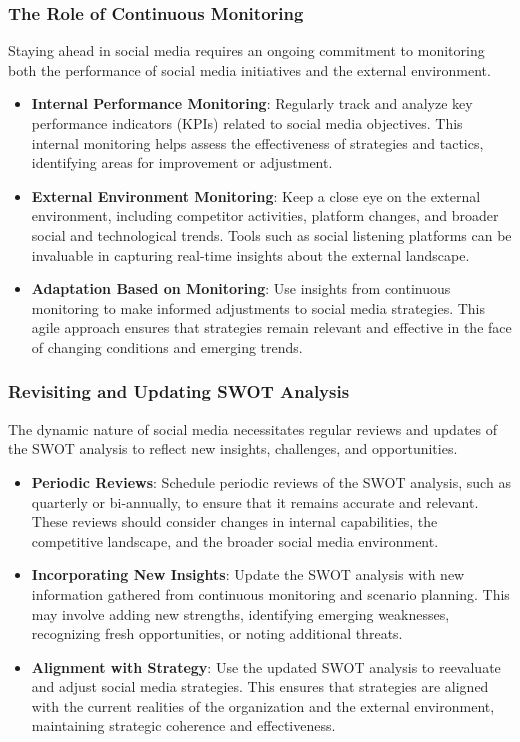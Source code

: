 \documentclass[
]{book}
\providecommand{\tightlist}{%
  \setlength{\itemsep}{0pt}\setlength{\parskip}{0pt}}
\begin{document}
\hypertarget{the-role-of-continuous-monitoring}{%
\subsubsection{The Role of Continuous Monitoring}\label{the-role-of-continuous-monitoring}}

Staying ahead in social media requires an ongoing commitment to monitoring both the performance of social media initiatives and the external environment.

\begin{itemize}
\tightlist
\item
  \textbf{Internal Performance Monitoring}: Regularly track and analyze key performance indicators (KPIs) related to social media objectives. This internal monitoring helps assess the effectiveness of strategies and tactics, identifying areas for improvement or adjustment.
\item
  \textbf{External Environment Monitoring}: Keep a close eye on the external environment, including competitor activities, platform changes, and broader social and technological trends. Tools such as social listening platforms can be invaluable in capturing real-time insights about the external landscape.
\item
  \textbf{Adaptation Based on Monitoring}: Use insights from continuous monitoring to make informed adjustments to social media strategies. This agile approach ensures that strategies remain relevant and effective in the face of changing conditions and emerging trends.
\end{itemize}

\hypertarget{revisiting-and-updating-swot-analysis}{%
\subsubsection{Revisiting and Updating SWOT Analysis}\label{revisiting-and-updating-swot-analysis}}

The dynamic nature of social media necessitates regular reviews and updates of the SWOT analysis to reflect new insights, challenges, and opportunities.

\begin{itemize}
\tightlist
\item
  \textbf{Periodic Reviews}: Schedule periodic reviews of the SWOT analysis, such as quarterly or bi-annually, to ensure that it remains accurate and relevant. These reviews should consider changes in internal capabilities, the competitive landscape, and the broader social media environment.
\item
  \textbf{Incorporating New Insights}: Update the SWOT analysis with new information gathered from continuous monitoring and scenario planning. This may involve adding new strengths, identifying emerging weaknesses, recognizing fresh opportunities, or noting additional threats.
\item
  \textbf{Alignment with Strategy}: Use the updated SWOT analysis to reevaluate and adjust social media strategies. This ensures that strategies are aligned with the current realities of the organization and the external environment, maintaining strategic coherence and effectiveness.
\end{itemize}
\end{document}
